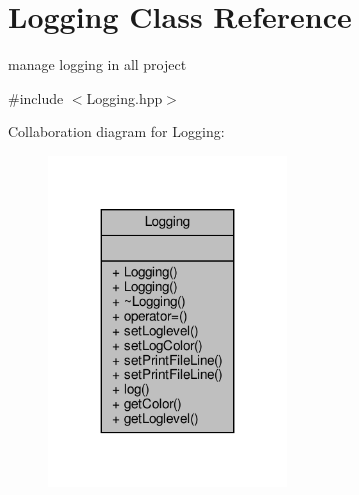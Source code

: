 \hypertarget{class_logging}{}\section{Logging Class Reference}
\label{class_logging}


manage logging in all project  




{\ttfamily \#include $<$Logging.\+hpp$>$}



Collaboration diagram for Logging\+:
\nopagebreak
\begin{figure}[H]
\begin{center}
\leavevmode
\includegraphics[width=179pt]{class_logging__coll__graph}
\end{center}
\end{figure}
